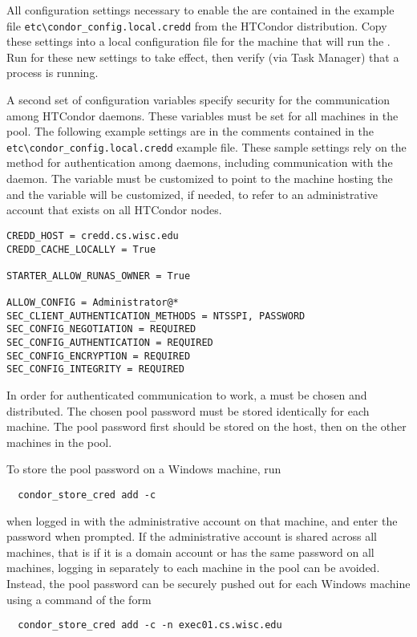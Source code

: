 All configuration settings necessary to enable the  are
contained in the example file \verb|etc\condor_config.local.credd|
from the HTCondor distribution. Copy these settings into a local
configuration file for the machine that will run the .
Run  for these new settings to take effect, then
verify (via Task Manager) that a  process is running.

A second set of configuration variables specify security for the
communication among HTCondor daemons.
These variables must be set for all machines in the pool.
The following example settings are in the comments contained in the
\verb|etc\condor_config.local.credd| example file.
These sample settings rely on the  method for
authentication among daemons, 
including communication with the  daemon.
The  variable must be customized to point to the machine
hosting the  and the  variable
will be customized, if needed, to refer to an administrative account 
that exists on all HTCondor nodes. 
\begin{verbatim}
CREDD_HOST = credd.cs.wisc.edu
CREDD_CACHE_LOCALLY = True

STARTER_ALLOW_RUNAS_OWNER = True

ALLOW_CONFIG = Administrator@*
SEC_CLIENT_AUTHENTICATION_METHODS = NTSSPI, PASSWORD
SEC_CONFIG_NEGOTIATION = REQUIRED
SEC_CONFIG_AUTHENTICATION = REQUIRED
SEC_CONFIG_ENCRYPTION = REQUIRED
SEC_CONFIG_INTEGRITY = REQUIRED
\end{verbatim}

In order for  authenticated communication to work,
a  must be chosen and distributed.
The chosen pool password must be stored identically for each machine.
The pool password first should be
stored on the  host, then on the other machines in the pool.

To store the pool password on a Windows machine, run
\begin{verbatim}
  condor_store_cred add -c
\end{verbatim}
when logged in with the administrative account on that machine,
and enter the password when prompted. 
If the administrative account is shared across all machines,
that is if it is a domain account or has the same password on all machines,
logging in separately to each machine in the pool can be avoided.
Instead, the pool password can be securely pushed out for each Windows machine
using a command of the form
\begin{verbatim}
  condor_store_cred add -c -n exec01.cs.wisc.edu
\end{verbatim}

